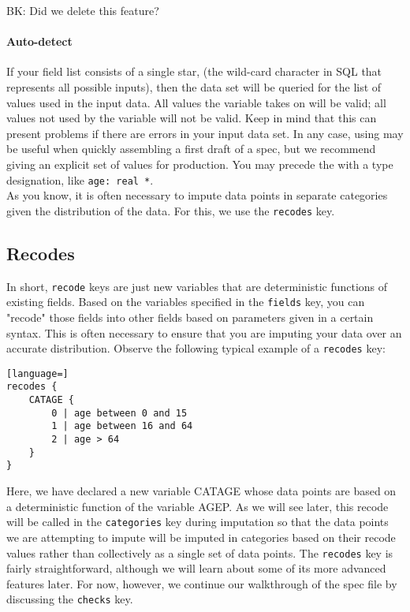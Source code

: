 \documentclass{article}
\begin{document}
{\comment BK: Did we delete this feature?}

\paragraph{Auto-detect} If your field list consists of a single star, {\tt *} (the wild-card character 
in SQL that represents all possible inputs), then the data set will be queried for the list of values 
used in the input data. All values the variable takes on will be valid; all values not used 
by the variable will not be valid. Keep in mind that this can present problems if there are errors 
in your input data set.
In any case, using {\tt *} may be useful when quickly assembling a first draft of a spec, but we recommend
giving an explicit set of values for production. You may precede the {\tt *}
with a type designation, like {\tt age: real *}.\\

As you know, it is often necessary to impute data points in separate categories given 
the distribution of the data. For this, we use the {\tt recodes} key.

\subsection{Recodes}
In short, {\tt recode} keys are just new variables that are deterministic functions of 
existing fields. Based on the variables specified in the 
{\tt fields} key, you can "recode" those fields into other fields
based on parameters given in a certain syntax. This is often necessary to ensure that you are imputing 
your data over an accurate distribution. Observe the following typical example of a {\tt recodes} key:

\begin{lstlisting}[language=]
recodes {
    CATAGE {
        0 | age between 0 and 15
        1 | age between 16 and 64
        2 | age > 64
    }
}
\end{lstlisting}

Here, we have declared a new variable CATAGE whose data points are based on a 
deterministic function of the variable AGEP. As we will see later, this recode will be called 
in the {\tt categories} key during imputation so that the data points we are attempting to 
impute will be imputed in categories based on their recode values rather than collectively 
as a single set of data points. The {\tt recodes} key is fairly straightforward, although we 
will learn about some of its more advanced features later. For now, however, we continue 
our walkthrough of the spec file by discussing the {\tt checks} key.
\end{document}
